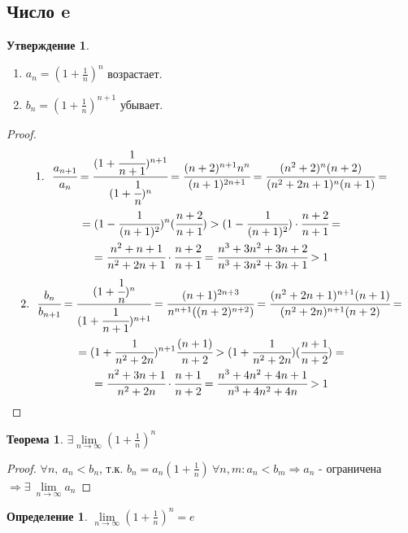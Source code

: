 \documentclass[a4paper, 12pt]{article}
\newcommand\tab[1][.5cm]{\hspace*{#1}}
\newcommand{\lims}{\lim\limits_{n\to \infty}}
\theoremstyle{definition}
\newtheorem*{definition}{Определение}
\newtheorem*{theorem}{Теорема}
\newtheorem*{statement}{Утверждение}
\begin{document}
    \subsection{Число e}
        \begin{statement} \tab
            \begin{enumerate}
                \item $a_n=(1+\frac{1}{n})^n$ возрастает.
                \item $b_n=(1+\frac{1}{n})^{n+1}$ убывает.
            \end{enumerate}
        \end{statement} 
        \begin{proof}
            \begin{multline*}
                1.\ \ \cfrac{a_{n+1}}{a_n}=\cfrac{(1+\cfrac{1}{n+1})^{n+1}}{(1+\cfrac{1}{n})^{n}}=\cfrac{(n+2)^{n+1}n^n}{(n+1)^{2n+1}}=\cfrac{(n^2+2)^n (n+2)}{(n^2+2n+1)^n (n+1)}=\\=(1-\cfrac{1}{(n+1)^2})^n (\cfrac{n+2}{n+1})>(1-\cfrac{1}{(n+1)^2})\cdot \cfrac{n+2}{n+1}=\\=\cfrac{n^2+n+1}{n^2+2n+1}\cdot \cfrac{n+2}{n+1}=\cfrac{n^3+3n^2+3n+2}{n^3+3n^2+3n+1}>1
            \end{multline*}
            \begin{multline*}
                2.\ \ \cfrac{b_n}{b_{n+1}}=\cfrac{(1+\cfrac{1}{n})^{n}}{(1+\cfrac{1}{n+1})^{n+1}}=\cfrac{(n+1)^{2n+3}}{n^{n+1}((n+2)^{n+2})}=\cfrac{(n^2+2n+1)^{n+1}(n+1)}{(n^2+2n)^{n+1}(n+2)}=\\=(1+\cfrac{1}{n^2+2n})^{n+1}\cfrac{(n+1)}{n+2}>(1+\cfrac{1}{n^2+2n})(\cfrac{n+1}{n+2})=\\=\cfrac{n^2+3n+1}{n^2+2n}\cdot \cfrac{n+1}{n+2}=\cfrac{n^3+4n^2+4n+1}{n^3+4n^2+4n}>1
            \end{multline*}
        \end{proof} 
        \begin{theorem}
            $\exists \lims (1+\frac{1}{n})^n$
        \end{theorem} 
        \begin{proof}
            $\forall n,\ a_n<b_n$, т.к. $b_n=a_n(1+\frac{1}{n})\ \forall n,m: a_n<b_m \Rightarrow a_n$ - ограничена $\Rightarrow \exists\ \lims a_n$
        \end{proof} 
        \begin{definition}
            $\lims (1+\frac{1}{n})^n=e$
        \end{definition} 
\end{document}
